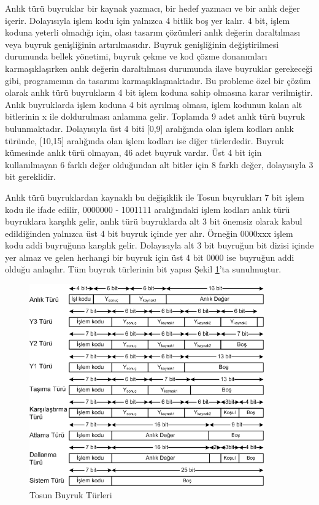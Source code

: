 Anlık türü buyruklar bir kaynak yazmacı, bir hedef yazmacı ve bir anlık değer içerir. Dolayısıyla işlem kodu için yalnızca 4 bitlik boş yer kalır. 4 bit, işlem koduna yeterli olmadığı için, olası tasarım çözümleri anlık değerin daraltılması veya buyruk genişliğinin artırılmasıdır. Buyruk genişliğinin değiştirilmesi durumunda bellek yönetimi, buyruk çekme ve kod çözme donanımları karmaşıklaşırken anlık değerin daraltılması durumunda ilave buyruklar gerekeceği gibi, programcının da tasarımı karmaşıklaşmaktadır. Bu probleme özel bir çözüm olarak anlık türü buyrukların 4 bit işlem koduna sahip olmasına karar verilmiştir. Anlık buyruklarda işlem koduna 4 bit ayrılmış olması, işlem kodunun kalan alt bitlerinin x ile doldurulması anlamına gelir. Toplamda 9 adet anlık türü buyruk bulunmaktadır. Dolayısıyla üst 4 biti [0,9] aralığında olan işlem kodları anlık türünde, [10,15] aralığında olan işlem kodları ise diğer türlerdedir. Buyruk kümesinde anlık türü olmayan, 46 adet buyruk vardır. Üst 4 bit için kullanılmayan 6 farklı değer olduğundan alt bitler için 8 farklı değer, dolayısıyla 3 bit gereklidir. \par

Anlık türü buyruklardan kaynaklı bu değişiklik ile Tosun buyrukları 7 bit işlem kodu ile ifade edilir, 0000000 - 1001111 aralığındaki işlem kodları anlık türü buyruklara karşılık gelir, anlık türü buyruklarda alt 3 bit önemsiz olarak kabul edildiğinden yalnızca üst 4 bit buyruk içinde yer alır. Örneğin 0000xxx işlem kodu addi buyruğuna karşılık gelir. Dolayısıyla alt 3 bit buyruğun bit dizisi içinde yer almaz ve gelen herhangi bir buyruk için üst 4 bit 0000 ise buyruğun addi olduğu anlaşılır. Tüm buyruk türlerinin bit yapısı Şekil \ref{image:instructionTypes}'ta sunulmuştur. \par

\begin{figure}[ht]
\centering
\shorthandoff{=}
\includegraphics[width=0.9\textwidth]{gorsel/instructionTypes.png}
\shorthandoff{=}
\caption{Tosun Buyruk Türleri}
\label{image:instructionTypes}
\end{figure}

